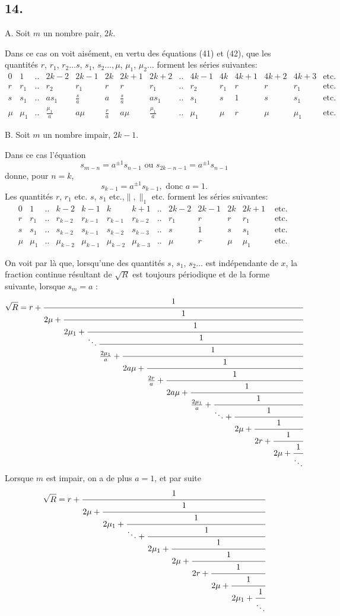 \documentclass[oneside, 12 pt, leqno]{memoir}
\begin{document}
\subsection*{14.}

\begin{center}A. Soit \(m\) un nombre pair, \(2 k\).\end{center}

Dans ce cas on voit aisément, en vertu des équations (41) et (42), que les quantités \(r\), \(r_1\), \(r_2 \dots s\), \(s_1\), \(s_2 \dots, \mu\), \(\mu_1\), \(\mu_2 \dots\) forment les séries suivantes: 
{\setlength\arraycolsep{0.25em}\[\begin{array}{cccccccccccc|ccc}
0&1&..&2k-2&2k-1&2k&2k+1&2k+2&..&4k-1&4k&4k+1&4k+2&4k+3&\text{etc.}\\
r&r_1&..&r_2&r_1&r&r&r_1&..&r_2&r_1&r&r&r_1&\text{etc.}\\
s&s_1&..&as_1&\frac{s}{a}&a&\frac{s}{a}&as_1&..&s_1&s&1&s&s_1&\text{etc.}\\
\mu&\mu_1&..&\frac{\mu_1}{a}&a \mu & \frac{r}{a}&a\mu& \frac{\mu_1}{a}&..&\mu_1&\mu&r&\mu&\mu_1&\text{etc.}
\end{array}\]}

\begin{center}B. Soit \(m\) un nombre impair, \(2 k-1\).\end{center}

Dans ce cas l'équation
\[s_{m-n}=a^{ \pm 1} s_{n-1} \text { ou } s_{2 k-n-1}=a^{ \pm 1} s_{n-1}\]
donne, pour \(n=k\),
\[s_{k-1}=a^{ \pm 1} s_{k-1}, \text { donc } a=1.\]
Les quantités \(r\), \(r_1\) etc. \(s\), \(s_1\) etc.,\(\|,\|_1\) etc. forment les séries suivantes:
\[\begin{array}{cccccccccc|ccc}
0 & 1 & .. & k-2 & k-1 & k & k+1 & .. & 2 k-2 & 2 k-1 & 2 k & 2 k+1 & \text { etc. } \\
r & r_1 & .. & r_{k-2} & r_{k-1} & r_{k-1} & r_{k-2} & .. & r_1 & r & r & r_1 & \text { etc. } \\
s & s_1 & .. & s_{k-2} & s_{k-1} & s_{k-2} & s_{k-3} & .. & s & 1 & s & s_1 & \text { etc. } \\
\mu & \mu_1 & .. & \mu_{k-2} & \mu_{k-1} & \mu_{k-2} & \mu_{k-3} & .. & \mu & r & \mu & \mu_1 & \text { etc. }
\end{array}\]

On voit par là que, lorsqu'une des quantités \(s\), \(s_1\), \(s_2 \dots\) est indépendante de \(x\), la fraction continue résultant de \(\sqrt{R}\) est toujours périodique et de la forme suivante, lorsque \(s_m=a\) :
\[\sqrt{R} = r+\cfrac{1}{2 \mu+\cfrac{1}{2 \mu_1+\cfrac{1}{\ddots \cfrac{1}{\frac{2\mu_1}{a}+\cfrac{1}{2 a \mu+\cfrac{1}{\frac{2 r}{a}+\cfrac{1}{2 a \mu+\cfrac{1}{\frac{2 \mu_1}{a}+\cfrac{1}{\ddots+\cfrac{1}{2 \mu+\cfrac{1}{2 r+\cfrac{1}{2 \mu+\cfrac{1}{\ddots}}}}}}}}}}}}}\]
Lorsque \(m\) est impair, on a de plus \(a=1\), et par suite
\[\sqrt{R}=r+\cfrac{1}{2 \mu+\cfrac{1}{2 \mu_1+\cfrac{1}{\ddots+\cfrac{1}{2 \mu_1+\cfrac{1}{2 \mu+\cfrac{1}{2 r+\cfrac{1}{2 \mu+\cfrac{1}{2 \mu_1+\cfrac{1}{\ddots}}}}}}}}}\]
\end{document}
